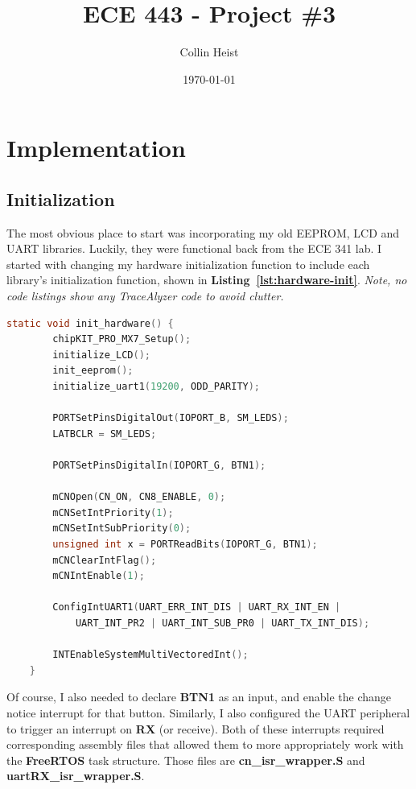 \documentclass[a4paper, 12pt]{article}
\begin{document}
\title{ECE 443 - Project \#3}
\author{Collin Heist}
\date{\today}
\maketitle

\tableofcontents
\lstlistoflistings
\newpage
{}

\section{Implementation}

\subsection{Initialization}
The most obvious place to start was incorporating my old EEPROM, LCD and UART libraries. Luckily, they were functional back from the ECE 341 lab. I started with changing my hardware initialization function to include each library's initialization function, shown in \textbf{Listing~\ref{lst:hardware-init}}. \textit{Note, no code listings show any TraceAlyzer code to avoid clutter.}

	\begin{mdframed}[backgroundcolor=code-gray, roundcorner=10pt,
								innerleftmargin=5, innertopmargin=5, innerbottommargin=5]	
	\begin{lstlisting}[language=C, caption=Hardware Initialization, tabsize=2, label={lst:hardware-init}]
	static void init_hardware() {
		chipKIT_PRO_MX7_Setup();
		initialize_LCD();
		init_eeprom();
		initialize_uart1(19200, ODD_PARITY);	

		PORTSetPinsDigitalOut(IOPORT_B, SM_LEDS);
		LATBCLR = SM_LEDS;
	
		PORTSetPinsDigitalIn(IOPORT_G, BTN1);
	
		mCNOpen(CN_ON, CN8_ENABLE, 0);
		mCNSetIntPriority(1);
		mCNSetIntSubPriority(0);
		unsigned int x = PORTReadBits(IOPORT_G, BTN1);
		mCNClearIntFlag();
		mCNIntEnable(1);

		ConfigIntUART1(UART_ERR_INT_DIS | UART_RX_INT_EN |
			UART_INT_PR2 | UART_INT_SUB_PR0 | UART_TX_INT_DIS);

		INTEnableSystemMultiVectoredInt();
	}
	\end{lstlisting}
	\end{mdframed}
	
Of course, I also needed to declare \textbf{BTN1} as an input, and enable the change notice interrupt for that button. Similarly, I also configured the UART peripheral to trigger an interrupt on \textbf{RX} (or receive). Both of these interrupts required corresponding assembly files that allowed them to more appropriately work with the \textbf{FreeRTOS} task structure. Those files are \textbf{cn\_isr\_wrapper.S} and \textbf{uartRX\_isr\_wrapper.S}.
 
\end{document}
